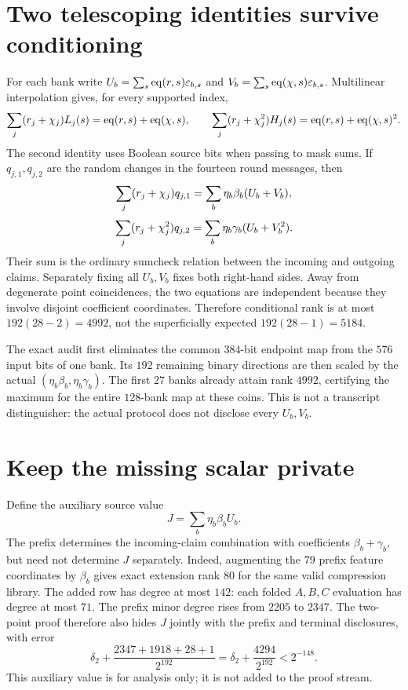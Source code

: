 \documentclass[11pt]{article}
\begin{document}
\section{Two telescoping identities survive conditioning}

For each bank write $U_b=\sum_s\operatorname{eq}(r,s)\varepsilon_{b,s}$ and $V_b=\sum_s\operatorname{eq}(\chi,s)\varepsilon_{b,s}$. Multilinear interpolation gives, for every supported index,
\[
 \sum_j(r_j+\chi_j)L_j(s)=\operatorname{eq}(r,s)+\operatorname{eq}(\chi,s),
 \qquad
 \sum_j(r_j+\chi_j^2)H_j(s)=\operatorname{eq}(r,s)+\operatorname{eq}(\chi,s)^2.
\]
The second identity uses Boolean source bits when passing to mask sums. If $q_{j,1},q_{j,2}$ are the random changes in the fourteen round messages, then
\[
 \sum_j(r_j+\chi_j)q_{j,1}=\sum_b\eta_b\beta_b(U_b+V_b),
\]
\[
 \sum_j(r_j+\chi_j^2)q_{j,2}=\sum_b\eta_b\gamma_b(U_b+V_b^2).
\]
Their sum is the ordinary sumcheck relation between the incoming and outgoing claims. Separately fixing all $U_b,V_b$ fixes both right-hand sides. Away from degenerate point coincidences, the two equations are independent because they involve disjoint coefficient coordinates. Therefore conditional rank is at most $192(28-2)=4992$, not the superficially expected $192(28-1)=5184$.

The exact audit first eliminates the common $384$-bit endpoint map from the $576$ input bits of one bank. Its $192$ remaining binary directions are then scaled by the actual $(\eta_b\beta_b,\eta_b\gamma_b)$. The first $27$ banks already attain rank $4992$, certifying the maximum for the entire $128$-bank map at these coins. This is not a transcript distinguisher: the actual protocol does not disclose every $U_b,V_b$.

\section{Keep the missing scalar private}

Define the auxiliary source value
\[
 J=\sum_b\eta_b\beta_b U_b.
\]
The prefix determines the incoming-claim combination with coefficients $\beta_b+\gamma_b$, but need not determine $J$ separately. Indeed, augmenting the $79$ prefix feature coordinates by $\beta_b$ gives exact extension rank $80$ for the same valid compression library. The added row has degree at most $142$: each folded $A,B,C$ evaluation has degree at most $71$. The prefix minor degree rises from $2205$ to $2347$. The two-point proof therefore also hides $J$ jointly with the prefix and terminal disclosures, with error
\[
 \delta_2+\frac{2347+1918+28+1}{2^{192}}
 =\delta_2+\frac{4294}{2^{192}}<2^{-148}.
\]
This auxiliary value is for analysis only; it is not added to the proof stream.
\end{document}
